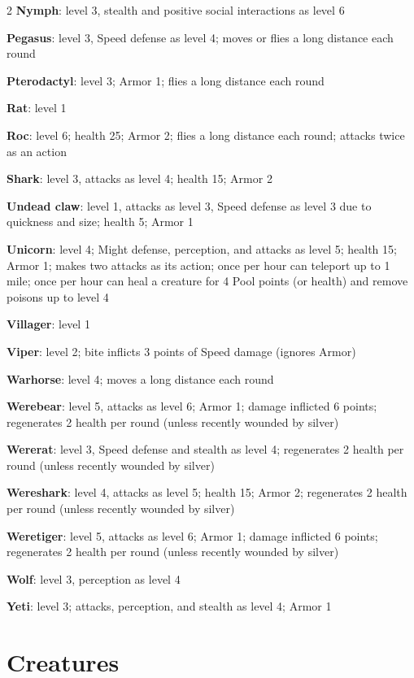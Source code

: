 \begin{multicols}{2}
\textbf{Nymph}: level 3, stealth and positive social interactions as level 6

\textbf{Pegasus}: level 3, Speed defense as level 4; moves or flies a long distance each round

\textbf{Pterodactyl}: level 3; Armor 1; flies a long distance each round

\textbf{Rat}: level 1

\textbf{Roc}: level 6; health 25; Armor 2; flies a long distance each round; attacks twice as an action

\textbf{Shark}: level 3, attacks as level 4; health 15; Armor 2

\textbf{Undead claw}: level 1, attacks as level 3, Speed defense as level 3 due to quickness and size; health 5; Armor 1

\textbf{Unicorn}: level 4; Might defense, perception, and attacks as level 5; health 15; Armor 1; makes two attacks as its action; once per hour can teleport up to 1 mile; once per hour can heal a creature for 4 Pool points (or health) and remove poisons up to level 4

\textbf{Villager}: level 1

\textbf{Viper}: level 2; bite inflicts 3 points of Speed damage (ignores Armor)

\textbf{Warhorse}: level 4; moves a long distance each round

\textbf{Werebear}: level 5, attacks as level 6; Armor 1; damage inflicted 6 points; regenerates 2 health per round (unless recently wounded by silver)

\textbf{Wererat}: level 3, Speed defense and stealth as level 4; regenerates 2 health per round (unless recently wounded by silver)

\textbf{Wereshark}: level 4, attacks as level 5; health 15; Armor 2; regenerates 2 health per round (unless recently wounded by silver)

\textbf{Weretiger}: level 5, attacks as level 6; Armor 1; damage inflicted 6 points; regenerates 2 health per round (unless recently wounded by silver)

\textbf{Wolf}: level 3, perception as level 4

\textbf{Yeti}: level 3; attacks, perception, and stealth as level 4; Armor 1

\section{Creatures}
 

\end{multicols}
